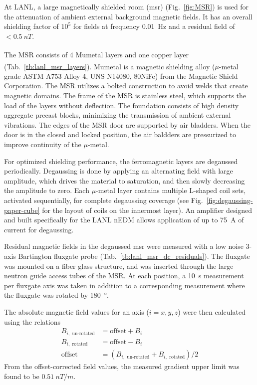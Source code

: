 At LANL, a large magnetically shielded room (\acrshort*{msr}) (Fig.~\ref{fig:MSR}) is used for the attenuation of ambient external background magnetic fields. It has an overall shielding factor of $10^5$ for fields at frequency \qty{0.01}{\hertz} and a residual field of $<\qty{0.5}{nT}$.

The MSR consists of 4 Mumetal\textsuperscript{\textregistered} layers and one copper layer (Tab.~\ref{tb:lanl_msr_layers}). Mumetal\textsuperscript{\textregistered} is a magnetic shielding alloy ($\mu$-metal grade ASTM A753 Alloy 4, UNS N14080, 80NiFe) from the Magnetic Shield Corporation. The MSR utilizes a bolted construction to avoid welds that create magnetic domains. The frame of the MSR is stainless steel, which supports the load of the layers without deflection. The foundation consists of high density aggregate precast blocks, minimizing the transmission of ambient external vibrations. The edges of the MSR door are supported by air bladders. When the door is in the closed and locked position, the air baldders are pressurized to improve continuity of the $\mu$-metal.

For optimized shielding performance, the ferromagnetic layers are degaussed periodically. Degaussing is done by applying an alternating field with large amplitude, which drives the material to saturation, and then slowly decreasing the amplitude to zero. Each $\mu$-metal layer contains multiple L-shaped coil sets, activated sequentially, for complete degaussing coverage (see Fig.~\ref{fig:degaussing-paper-cube} for the layout of coils on the innermost layer). An amplifier designed and built specifically for the LANL nEDM allows application of up to \qty{75}{A} of current for degaussing.

Residual magnetic fields in the degaussed \acrshort*{msr} were measured with a low noise 3-axis Bartington fluxgate probe (Tab.~\ref{tb:lanl_msr_dc_residuals}). The fluxgate was mounted on a fiber glass structure, and was inserted through the large neutron guide access tubes of the MSR. At each position, a \qty{10}{\second} measurement per fluxgate axis was taken in addition to a corresponding measurement where the fluxgate was rotated by \qty{180}{\degree}.

The absolute magnetic field values for an axis ($i=x,y,z$) were then calculated using the relations
%
\begin{align}
    B_{i,\text{ un-rotated}}&=\text{offset}+B_{i}\\
    B_{i,\text{ rotated}}&=\text{offset}-B_{i}\\
    \text{offset}&= (B_{i,\text{ un-rotated}} + B_{i,\text{ rotated}})/2
\end{align}
%
From the offset-corrected field values, the measured gradient upper limit was found to be $\qty{0.51}{nT\per m}$.

